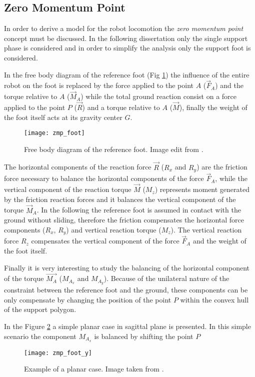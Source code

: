 \subsection{Zero Momentum Point}
In order to derive a model for the robot locomotion the \emph{zero momentum point} concept
\cite{Vukobratovic1969} must be discussed.
In the following dissertation only the single support phase is considered and in order to simplify the analysis only the support foot is considered.
\par
In the free body diagram of the reference foot (Fig \ref{fig:zmp_foot}) the influence of the
entire robot on the foot is replaced by the force applied to the point $A$
($\vec{F}_A$) and the torque relative to $A$ ($\vec{M}_A$) while the
total ground reaction consist on a force applied to the point $P$ ($\vec{R}$) and a torque
relative to $A$ ($\vec{M}$), finally the weight of the foot itself acts at its gravity center $G$.
\begin{figure}[!ht]
  \centering
  \texttt{[image: zmp\_foot]}
  \caption{Free body diagram of the reference foot. Image edit from \cite{Vukobratov2004}. \label{fig:zmp_foot}}
\end{figure}
The horizontal components of the reaction force $\vec{R}$ ($R_x$ and $R_y$) are 
the friction force necessary to balance the horizontal components of the force $\vec{F}_A$, while
the vertical component of the reaction torque $\vec{M}$ ($M_z$) represents moment generated by the
friction reaction forces and it balances the vertical component of the torque $\vec{M}_A$.
In the following the reference foot is assumed in contact with the ground without sliding, therefore
the friction compensates the horizontal force components ($R_x$, $R_y$) and vertical reaction torque
($M_z$). The vertical reaction force $R_z$ compensates the vertical component of the force
$\vec{F}_A$ and the weight of the foot itself.  
\par
Finally it is very interesting to study the balancing of the horizontal component of the
torque $\vec{M_A}$ ($M_{A_x}$ and $M_{A_y}$). Because of the unilateral nature of the constraint between
the reference foot and the ground, these components can be only compensate by changing
the position of the point $P$ within the convex hull of the support polygon.
\par
In the Figure \ref{fig:zmp_foot_y} a simple planar case in sagittal plane is presented. In this
simple scenario the component $M_{A_x}$ is balanced by shifting the point $P$ 
\begin{figure}[!ht]
  \centering
  \texttt{[image: zmp\_foot\_y]}
  \caption{Example of a planar case. Image taken from \cite{Vukobratov2004}. \label{fig:zmp_foot_y}}
\end{figure}

